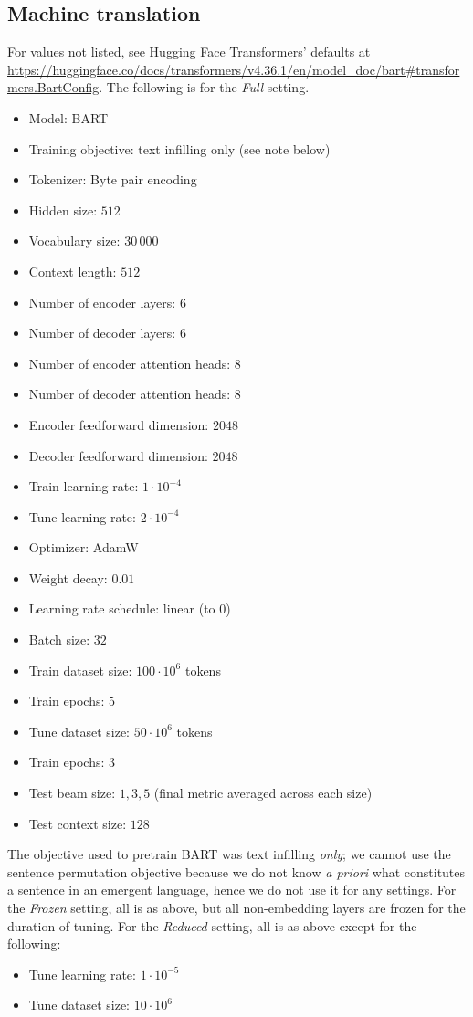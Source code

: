 \subsection{Machine translation}
\unskip\label{sec:hparams-mt}
For values not listed, see Hugging Face Transformers' defaults at \url{https://huggingface.co/docs/transformers/v4.36.1/en/model_doc/bart\#transformers.BartConfig}.
The following is for the \emph{Full} setting.
\begin{itemize}[itemsep=-1.2ex]
  \item Model: BART
  \item Training objective: text infilling only (see note below)
  \item Tokenizer: Byte pair encoding
  \item Hidden size: $512$
  \item Vocabulary size: $30\,000$
  \item Context length: $512$
  \item Number of encoder layers: $6$
  \item Number of decoder layers: $6$
  \item Number of encoder attention heads: $8$
  \item Number of decoder attention heads: $8$
  \item Encoder feedforward dimension: $2048$
  \item Decoder feedforward dimension: $2048$
  \item Train learning rate: $1\cdot10^{-4}$
  \item Tune learning rate: $2\cdot10^{-4}$
  \item Optimizer: AdamW
  \item Weight decay: $0.01$
  \item Learning rate schedule: linear (to $0$)
  \item Batch size: $32$
  \item Train dataset size: $100\cdot10^6$ tokens
  \item Train epochs: $5$
  \item Tune dataset size: $50\cdot10^6$ tokens
  \item Train epochs: $3$
  \item Test beam size: $1,3,5$ (final metric averaged across each size)
  \item Test context size: $128$
\end{itemize}
The objective used to pretrain BART was text infilling \emph{only}; we cannot use the sentence permutation objective because we do not know \emph{a priori} what constitutes a sentence in an emergent language, hence we do not use it for any settings.
For the \emph{Frozen} setting, all is as above, but all non-embedding layers are frozen for the duration of tuning.
For the \emph{Reduced} setting, all is as above except for the following:
\begin{itemize}[itemsep=-1.2ex]
  \item Tune learning rate: $1\cdot10^{-5}$
  \item Tune dataset size: $10\cdot10^6$
\end{itemize}

